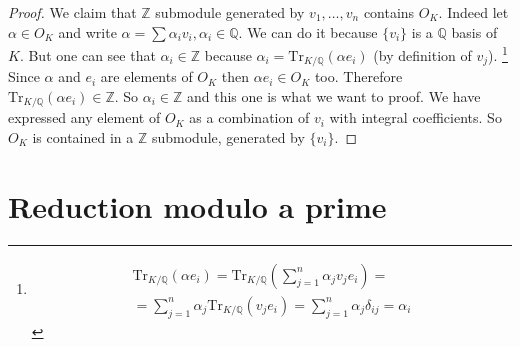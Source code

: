 \begin{theorem}
\begin{proof}
    We claim that $\mathbb{Z}$ submodule generated by $v_1, \dots,
    v_n$ contains $O_K$. Indeed let $\alpha \in O_K$ and write
    \(
    \alpha = \sum \alpha_i v_i, \alpha_i \in \mathbb{Q}
    \). We can do it because $\{v_i\}$ is a $\mathbb{Q}$ basis of
    $K$. But one can see that $\alpha_i \in \mathbb{Z}$ because
    $\alpha_i = \mathrm{Tr}_{K/\mathbb{Q}}\left(\alpha e_i\right)$ (by
    definition of $v_j$).
    \footnote{
      \begin{eqnarray}
        \mathrm{Tr}_{K/\mathbb{Q}}\left(\alpha e_i\right) =
        \mathrm{Tr}_{K/\mathbb{Q}}\left(\sum_{j=1}^n\alpha_j v_j
        e_i\right) =
        \nonumber \\
        = \sum_{j=1}^n\alpha_j
        \mathrm{Tr}_{K/\mathbb{Q}}\left( v_j
        e_i\right) = 
        \sum_{j=1}^n\alpha_j \delta_{ij} = \alpha_i
        \nonumber
      \end{eqnarray}
    }
    Since $\alpha$ and $e_i$ are elements of
    $O_K$ then $\alpha e_i \in O_K$ too. Therefore
    $\mathrm{Tr}_{K/\mathbb{Q}}\left(\alpha e_i\right) \in
    \mathbb{Z}$. So $\alpha_i \in \mathbb{Z}$ and this one is what we
    want to proof. We have expressed any element of $O_K$ as a
    combination of $v_i$ with integral coefficients. So $O_K$ is contained
    in a $\mathbb{Z}$ submodule, generated by $\{v_i\}$.  
  \end{proof}
\end{theorem}

\section{Reduction modulo a prime}

